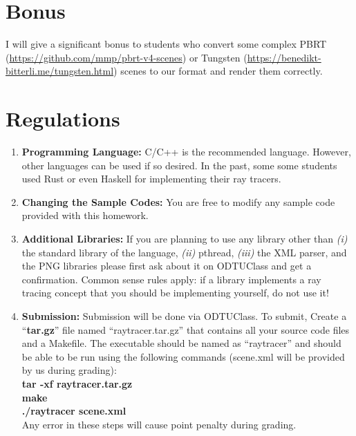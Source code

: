 \documentclass[12pt]{article}
\begin{document}
\section{Bonus}

I will give a significant bonus to students who convert some complex
PBRT (\url{https://github.com/mmp/pbrt-v4-scenes}) or Tungsten
(\url{https://benedikt-bitterli.me/tungsten.html}) scenes to our format
and render them correctly.

\section{Regulations}

\begin{enumerate}

\item \textbf{Programming Language:} C/C++ is the recommended language.
However, other languages can be used if so desired. In the past, some
some students used Rust or even Haskell for implementing their ray
tracers.

\item \textbf{Changing the Sample Codes:} You are free to modify any
sample code provided with this homework.

\item \textbf{Additional Libraries:} If you are planning to use any
library other than \textit{(i)} the standard library of the language,
\textit{(ii)} pthread, \textit{(iii)} the XML parser, and the PNG
libraries please first ask about
it on ODTUClass and get a confirmation. Common sense rules apply: if a
library implements a ray tracing concept that you should be
implementing yourself, do not use it!

\item \textbf{Submission:} Submission will be done via ODTUClass. 
To submit, Create a
``\textbf{tar.gz}''  file  named  ``raytracer.tar.gz'' that
contains all your source code files and a Makefile. The
executable should  be  named as  ``raytracer'' and  should  be
able  to  be  run  using  the following commands (scene.xml
        will be provided by us during grading):\\

\indent \textbf{tar -xf raytracer.tar.gz}\\
\indent \textbf{make}\\
\indent \textbf{./raytracer scene.xml}\\

\noindent Any error in these steps will cause point penalty during
grading.


\end{enumerate}
\end{document}
